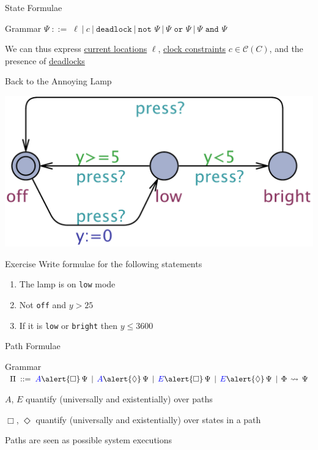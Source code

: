 \documentclass{beamer}
\def\dgold#1{{\alert{#1}}}
\def\dkb#1{{\blue #1}}
\begin{document}
\begin{frame}{State Formulae}

        \begin{block}{Grammar}
        $
        \Psi\; ::=\; \ell ~|~ c ~|~ \texttt{deadlock} ~|~ \texttt{not~}\Psi ~|~ \Psi
        \texttt{ or }\Psi ~|~ \Psi \texttt{ and }\Psi 
        $
        \end{block}

        We can thus express \alert{\underline{current locations}} $\ell$, 
        \alert{\underline{clock constraints}} $c \in \mathcal{C}(C)$, 
        and the presence of \alert{\underline{deadlocks}}
\end{frame}

\begin{slide}{Back to the Annoying Lamp}

  \centering
  \includegraphics[scale=0.30]{./images/Lamp}

  \begin{block}{Exercise}
          Write formulae for the following statements
  \begin{enumerate}
    \item The lamp is on \texttt{low} mode
    \item Not \texttt{off} and $y>25$
    \item If it is \texttt{low} or \texttt{bright} then $y\leq 3600$
  \end{enumerate}
  \end{block} 
\end{slide}

\begin{slide}{Path Formulae}
\newcommand{\Boxc}{\dgold{\Box}}
\newcommand{\Diamondc}{\dgold{\Diamond}}
\newcommand{\Ac}{\dkb{A}}
\newcommand{\Ec}{\dkb{E}}

\begin{block}{Grammar}
$\Pi\; ::=\;  \Ac \Boxc\, \Psi\, \mid\, \Ac\Diamondc\, \Psi\, \mid\, \Ec \Boxc\, \Psi\, \mid\, \Ec \Diamondc\, \Psi\, \mid\,  \Phi\, \leadsto\, \Psi
$
\end{block}

\dkb{$A$, $E$} quantify (universally and existentially) over paths

\dgold{$\Box$, $\Diamond$} quantify (universally and existentially) over
states in a path

\bigskip
Paths are seen as possible system executions
\end{slide}
\end{document}
